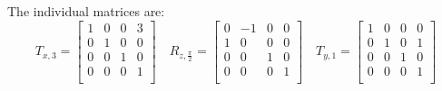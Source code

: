 \documentclass[12pt]{article}
\begin{document}
The individual matrices are:
\[
T_{x,3} = \begin{bmatrix}
    1 & 0 & 0 & 3\\
    0 & 1 & 0 & 0\\
    0 & 0 & 1 & 0\\
    0 & 0 & 0 & 1\\
\end{bmatrix}
\quad
R_{z,\frac{\pi}{2}} = \begin{bmatrix}
    0 & -1 & 0 & 0\\
    1 &  0 & 0 & 0\\
    0 &  0 & 1 & 0\\
    0 &  0 & 0 & 1\\
\end{bmatrix}
\quad
T_{y,1} = \begin{bmatrix}
    1 & 0 & 0 & 0\\
    0 & 1 & 0 & 1\\
    0 & 0 & 1 & 0\\
    0 & 0 & 0 & 1\\
\end{bmatrix}
\]
\end{document}
